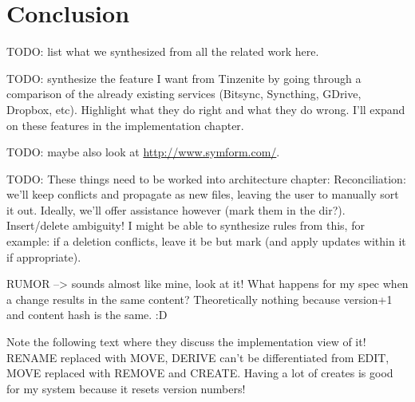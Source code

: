 \section{Conclusion}
\label{sec:Conclusion}


TODO: list what we synthesized from all the related work here.

TODO: synthesize the feature I want from Tinzenite by going through a comparison of the already existing services (Bitsync, Syncthing, GDrive, Dropbox, etc).
Highlight what they do right and what they do wrong.
I'll expand on these features in the implementation chapter.

TODO: maybe also look at \url{http://www.symform.com/}.

TODO: These things need to be worked into architecture chapter:
Reconciliation: we'll keep conflicts and propagate as new files, leaving the user to manually sort it out.
Ideally, we'll offer assistance however (mark them in the dir?).
Insert/delete ambiguity!
I might be able to synthesize rules from this, for example: if a deletion conflicts, leave it be but mark (and apply updates within it if appropriate).

RUMOR --> sounds almost like mine, look at it!
What happens for my spec when a change results in the same content?
Theoretically nothing because version+1 and content hash is the same. :D

Note the following text where they discuss the implementation view of it!
RENAME replaced with MOVE, DERIVE can't be differentiated from EDIT, MOVE replaced with REMOVE and CREATE.
Having a lot of creates is good for my system because it resets version numbers!
